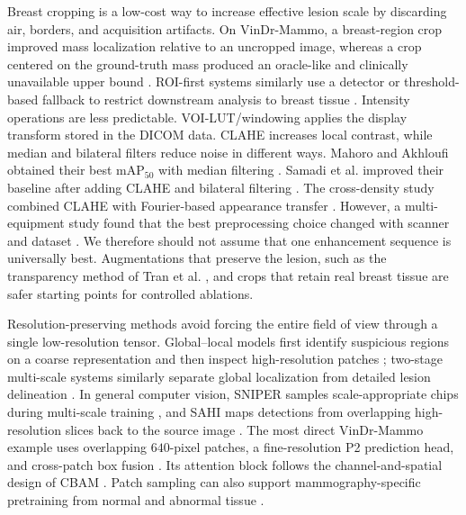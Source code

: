 Breast cropping is a low-cost way to increase effective lesion scale by
discarding air, borders, and acquisition artifacts.  On VinDr-Mammo, a
breast-region crop improved mass localization relative to an uncropped image,
whereas a crop centered on the ground-truth mass produced an oracle-like and
clinically unavailable upper bound \cite{ozic2023scenarios}.  ROI-first systems
similarly use a detector or threshold-based fallback to restrict downstream
analysis to breast tissue \cite{huynh2023roi}. Intensity operations are less
predictable. VOI-LUT/windowing applies the display transform stored in the
DICOM data. CLAHE increases local contrast, while median and bilateral filters
reduce noise in different ways. Mahoro and Akhloufi obtained their best
mAP$_{50}$ with median filtering \cite{mahoro2023oneshot}. Samadi et al.
improved their baseline after adding CLAHE and bilateral filtering
\cite{samadi2026yolo}. The cross-density study combined CLAHE with Fourier-based
appearance transfer \cite{nguyen2023crossdensity}. However, a multi-equipment
study found that the best preprocessing choice changed with scanner and dataset
\cite{ferreira2026preprocessing}. We therefore should not assume that one
enhancement sequence is universally best. Augmentations that preserve the
lesion, such as the transparency method of Tran et al.
\cite{tran2023transparency}, and crops that retain real breast tissue are safer
starting points for controlled ablations.

Resolution-preserving methods avoid forcing the entire field of view through a
single low-resolution tensor.  Global--local models first identify suspicious
regions on a coarse representation and then inspect high-resolution patches
\cite{shen2021gmic}; two-stage multi-scale systems similarly separate global
localization from detailed lesion delineation \cite{yan2021multiscale}.  In
general computer vision, SNIPER samples scale-appropriate chips during
multi-scale training \cite{singh2018sniper}, and SAHI maps detections from
overlapping high-resolution slices back to the source image
\cite{akyon2022sahi}. The most direct VinDr-Mammo example uses overlapping
$640$-pixel patches, a fine-resolution P2 prediction head, and cross-patch box
fusion \cite{bulatovic2025patched}. Its attention block follows the
channel-and-spatial design of CBAM \cite{woo2018cbam}. Patch sampling can also
support mammography-specific pretraining from normal and abnormal tissue
\cite{vanvorst2024siamese}.

